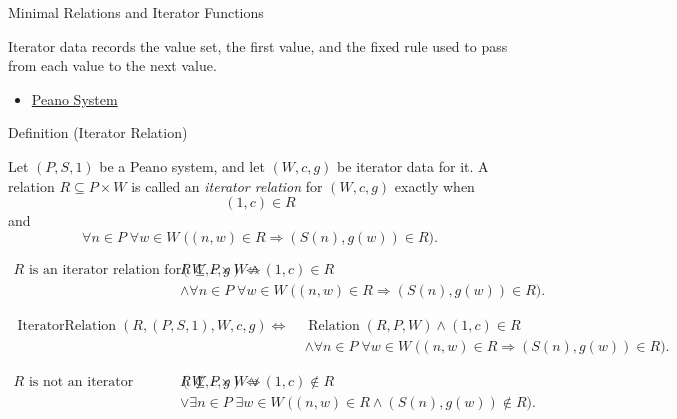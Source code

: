 \begin{topicbox}{Minimal Relations and Iterator Functions}
\begin{remark*}[Interpretation]
Iterator data records the value set, the first value, and the fixed rule used
to pass from each value to the next value.
\end{remark*}

\begin{dependencies}
\begin{itemize}
  \item \hyperref[def:peano-system]{Peano System}
\end{itemize}
\end{dependencies}

\begin{definitionbox}{Definition (Iterator Relation)}
\begin{definition}
\label{def:iterator-relation}
Let $(P,S,1)$ be a Peano system, and let $(W,c,g)$ be iterator data for it. A
relation $R\subseteq P\times W$ is called an \emph{iterator relation} for
$(W,c,g)$ exactly when
\[
(1,c)\in R
\]
and
\[
\forall n\in P\;\forall w\in W\;
\bigl((n,w)\in R\Longrightarrow (S(n),g(w))\in R\bigr).
\]
\end{definition}
\end{definitionbox}

\begin{remark*}
\[
\begin{aligned}
R \text{ is an iterator relation for } (W,c,g)
\Longleftrightarrow\;&
R\subseteq P\times W
\land (1,c)\in R\\
&\land
\forall n\in P\;\forall w\in W\;
\bigl((n,w)\in R\Longrightarrow (S(n),g(w))\in R\bigr).
\end{aligned}
\]
\end{remark*}

\begin{remark*}
\[
\begin{aligned}
\operatorname{IteratorRelation}(R,(P,S,1),W,c,g)
\Longleftrightarrow\;&
\operatorname{Relation}(R,P,W)
\land (1,c)\in R\\
&\land
\forall n\in P\;\forall w\in W\;
\bigl((n,w)\in R\Longrightarrow (S(n),g(w))\in R\bigr).
\end{aligned}
\]
\end{remark*}

\begin{remark*}
\[
\begin{aligned}
R \text{ is not an iterator relation for } (W,c,g)
\Longleftrightarrow\;&
R\not\subseteq P\times W
\lor (1,c)\notin R\\
&\lor \exists n\in P\;\exists w\in W\;
\bigl((n,w)\in R\land (S(n),g(w))\notin R\bigr).
\end{aligned}
\]
\end{remark*}


\end{topicbox}
